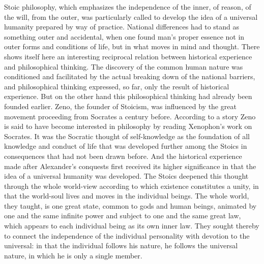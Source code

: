 \documentclass[12pt,a4paper,openany]{book}
\newcommand{\opage}[1]{\marginnote{\footnotesize\textit{[#1]}}}
\begin{document}
Stoic philosophy, which emphasizes the independence of the inner, of reason,
of the will, from the outer, was particularly called to
develop the idea of a universal humanity prepared by way of practice.
National differences had to
stand as something outer and accidental, when one found man's
proper essence not in outer forms and conditions of life, but
in what moves in mind and thought. There shows itself here an
interesting reciprocal relation between historical experience and
philosophical thinking. The discovery of the common human nature
was conditioned and facilitated by the actual breaking down of the
national barriers, and philosophical thinking expressed,
\opage{169}so far, only the result of historical experience. But on
the other hand this philosophical thinking had already been
founded earlier. Zeno, the founder of Stoicism, was influenced
by the great movement proceeding from Socrates a century before. According to a story Zeno
is said to have become interested in philosophy by reading Xenophon's work on Socrates.
It was the Socratic thought of self-knowledge as the foundation
of all knowledge and conduct of life that was developed further among the Stoics in
consequences that had not been drawn before. And the
historical experience made after Alexander's conquests
first received its higher significance in that the idea of a
universal humanity was developed. The Stoics deepened this
thought through the whole world-view according to which
existence constitutes a unity, in that the world-soul lives and moves
in the individual beings. The whole world, they taught, is one great
state, common to gods and human beings, animated by one and the same
infinite power and subject to one and the same great law, which
appears to each individual being as its own inner law.
They sought thereby to connect the independence of the individual
personality with devotion to the universal: in that the
individual follows his nature, he follows the universal nature,
in which he is only a single member.
\end{document}
